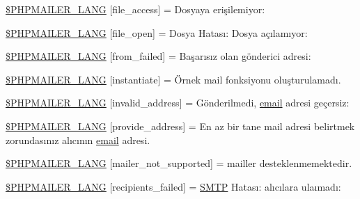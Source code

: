 \begin{DoxyCompactItemize}
\item 
\hyperlink{phpmailer_8lang-tr_8php_a7e83349023b856ef9e5c46e30ae6d51e}{\$\+P\+H\+P\+M\+A\+I\+L\+E\+R\+\_\+\+L\+A\+NG} \mbox{[}\textquotesingle{}file\+\_\+access\textquotesingle{}\mbox{]} = \textquotesingle{}Dosyaya erişilemiyor\+: \textquotesingle{}
\item 
\hyperlink{phpmailer_8lang-tr_8php_a28d1a6517bf4c942a0ddd506188ad2e0}{\$\+P\+H\+P\+M\+A\+I\+L\+E\+R\+\_\+\+L\+A\+NG} \mbox{[}\textquotesingle{}file\+\_\+open\textquotesingle{}\mbox{]} = \textquotesingle{}Dosya Hatası\+: Dosya açılamıyor\+: \textquotesingle{}
\item 
\hyperlink{phpmailer_8lang-tr_8php_adf832ae12155a09be077c6d5e4fd7e22}{\$\+P\+H\+P\+M\+A\+I\+L\+E\+R\+\_\+\+L\+A\+NG} \mbox{[}\textquotesingle{}from\+\_\+failed\textquotesingle{}\mbox{]} = \textquotesingle{}Başarısız olan gönderici adresi\+: \textquotesingle{}
\item 
\hyperlink{phpmailer_8lang-tr_8php_ad58dde16780f4770ccf4dd282ea1f5ad}{\$\+P\+H\+P\+M\+A\+I\+L\+E\+R\+\_\+\+L\+A\+NG} \mbox{[}\textquotesingle{}instantiate\textquotesingle{}\mbox{]} = \textquotesingle{}Örnek mail fonksiyonu oluşturulamadı.\textquotesingle{}
\item 
\hyperlink{phpmailer_8lang-tr_8php_a42d61bcea4c79599ecb44fd062f54d47}{\$\+P\+H\+P\+M\+A\+I\+L\+E\+R\+\_\+\+L\+A\+NG} \mbox{[}\textquotesingle{}invalid\+\_\+address\textquotesingle{}\mbox{]} = \textquotesingle{}Gönderilmedi, \hyperlink{actions_2account_8php_a011c66ae212438e0d7de7c0e40451bb3}{email} adresi geçersiz\+: \textquotesingle{}
\item 
\hyperlink{phpmailer_8lang-tr_8php_a8b97897c2406b7392b056f375feeefbb}{\$\+P\+H\+P\+M\+A\+I\+L\+E\+R\+\_\+\+L\+A\+NG} \mbox{[}\textquotesingle{}provide\+\_\+address\textquotesingle{}\mbox{]} = \textquotesingle{}En az bir tane mail adresi belirtmek zorundasınız alıcının \hyperlink{actions_2account_8php_a011c66ae212438e0d7de7c0e40451bb3}{email} adresi.\textquotesingle{}
\item 
\hyperlink{phpmailer_8lang-tr_8php_aa2ebcb8833ee83a7ad67401c4bb3a6ad}{\$\+P\+H\+P\+M\+A\+I\+L\+E\+R\+\_\+\+L\+A\+NG} \mbox{[}\textquotesingle{}mailer\+\_\+not\+\_\+supported\textquotesingle{}\mbox{]} = \textquotesingle{} mailler desteklenmemektedir.\textquotesingle{}
\item 
\hyperlink{phpmailer_8lang-tr_8php_a7589d30bb9b368327c2df015f3e6bcba}{\$\+P\+H\+P\+M\+A\+I\+L\+E\+R\+\_\+\+L\+A\+NG} \mbox{[}\textquotesingle{}recipients\+\_\+failed\textquotesingle{}\mbox{]} = \textquotesingle{}\hyperlink{class_s_m_t_p}{S\+M\+TP} Hatası\+: alıcılara ulaımadı\+: \textquotesingle{}

\end{DoxyCompactItemize}
